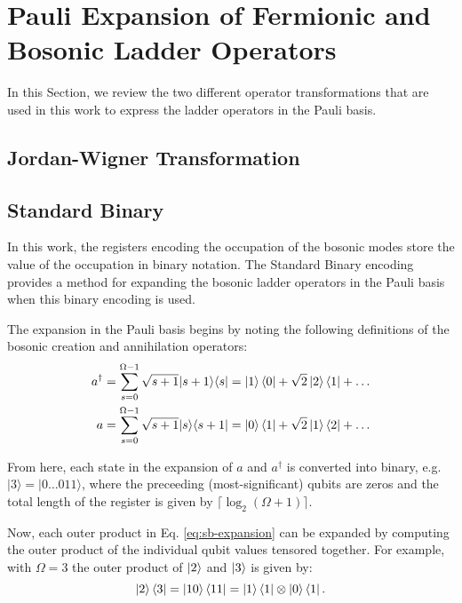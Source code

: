 \section{Pauli Expansion of Fermionic and Bosonic Ladder Operators}
\label{sec:SB}

In this Section, we review the two different operator transformations that are used in this work to express the ladder operators in the Pauli basis.

\subsection{Jordan-Wigner Transformation}

\subsection{Standard Binary}

In this work, the registers encoding the occupation of the bosonic modes store the value of the occupation in binary notation.
The Standard Binary encoding \cite{standard-binary} provides a method for expanding the bosonic ladder operators in the Pauli basis when this binary encoding is used.

The expansion in the Pauli basis begins by noting the following definitions of the bosonic creation and annihilation operators:
\begin{align}
    \label{eq:sb-expansion}
    a^\dagger &= \sum_{s = 0}^{\Omega - 1}\sqrt{s + 1}|s + 1\rangle \langle s| = \ket{1}\bra{0} + \sqrt{2}\ket{2}\bra{1} + \dots\\
    a &= \sum_{s = 0}^{\Omega - 1}\sqrt{s + 1}|s\rangle \langle s + 1| = \ket{0}\bra{1} + \sqrt{2}\ket{1}\bra{2} + \dots\\
\end{align}

From here, each state in the expansion of $a$ and $a^\dagger$ is converted into binary, e.g. $|3\rangle = |0\hdots011\rangle$, where the preceeding (most-significant) qubits are zeros and the total length of the register is given by $\lceil \log_2 (\Omega+1) \rceil$.

Now, each outer product in Eq. \ref{eq:sb-expansion} can be expanded by computing the outer product of the individual qubit values tensored together.
For example, with $\Omega = 3$ the outer product of $\ket{2}$ and $\ket{3}$ is given by:
\begin{equation}
    \ket{2}\bra{3} = \ket{10}\bra{11} = \ket{1}\bra{1} \otimes \ket{0}\bra{1}.
\end{equation}

